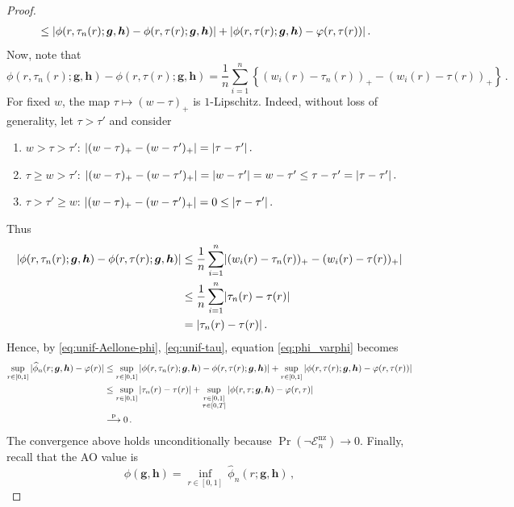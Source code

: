 \documentclass{article}
\makeatletter
\theoremstyle{definition}
\newcommand{\abs}[1]{%
	\ensuremath{%
		\if@display
		\left| #1 \right|
		\else
		\lvert #1 \rvert
		\fi
	}%
}
\newcommand*{\bb}{\boldsymbol}
\def\bh{\bb{h}}
\def\bg{\bb{g}}
\makeatother
\begin{document}
\begin{bibunit}
\begin{proof}
\begin{equation}
\begin{aligned}
			&\leq \abs{\phi(r, \tau_n(r); \bg, \bh) - \phi(r, \tau(r); \bg, \bh) } + \abs{\phi(r, \tau(r); \bg, \bh) - \varphi(r, \tau(r))} \,.
		\end{aligned}
	\end{equation}
Now, note that
$$
	\phi(r, \tau_n(r); \bg, \bh) - \phi(r, \tau(r); \bg, \bh) = \frac{1}{n} \sum_{i = 1}^n \left\{(w_i(r)- \tau_n(r))_{+} - (w_i(r) - \tau(r))_{+}\right\} \,.
$$
For fixed $w$, the map $\tau \mapsto (w - \tau)_{+}$ is $1$-Lipschitz.
Indeed, without loss of generality, let $\tau > \tau'$ and consider
\begin{enumerate}
	\item $w > \tau > \tau'$: $\abs{(w - \tau)_{+} - (w - \tau')_{+}} = \abs{\tau - \tau'} \,.$
	\item $\tau \geq w > \tau'$: $\abs{(w - \tau)_{+} - (w - \tau')_{+}} = \abs{w - \tau'} = w - \tau' \leq \tau - \tau' = \abs{\tau - \tau'} \,.$
	\item $\tau > \tau' \geq w$: $\abs{(w - \tau)_{+} - (w - \tau')_{+}} = 0 \leq \abs{\tau - \tau'} \,.$
\end{enumerate}
Thus
$$
	\begin{aligned}
		\abs{\phi(r, \tau_n(r); \bg, \bh) - \phi(r, \tau(r); \bg, \bh)} & \leq \frac{1}{n} \sum_{i = 1}^n \abs{(w_i(r)- \tau_n(r))_{+} - (w_i(r) - \tau(r))_{+}}  \\
		&\leq \frac{1}{n} \sum_{i = 1}^n \abs{\tau_n(r) - \tau(r)} \\
		&=  \abs{\tau_n(r) - \tau(r)} \,.
	\end{aligned}
$$
Hence, by \eqref{eq:unif-Aellone-phi}, \eqref{eq:unif-tau}, equation \eqref{eq:phi_varphi} becomes
	$$
		\begin{aligned}
			 \underset{r \in [0,1]}{\sup}\, \abs{\widehat\phi_n(r;\bg,\bh) - \varphi(r)} &\leq  \underset{r \in [0,1]}{\sup}\,\abs{\phi(r, \tau_n(r); \bg, \bh) - \phi(r, \tau(r); \bg, \bh) } +  \underset{r \in [0,1]}{\sup}\,\abs{\phi(r, \tau(r); \bg, \bh) - \varphi(r, \tau(r))} \\
			&\leq \underset{r \in [0,1]}{\sup}\,  \abs{\tau_n(r) - \tau(r)} +  \underset{\substack{r \in [0,1] \\ \tau \in [0, T]}}{\sup} \,\abs{\phi(r, \tau; \bg, \bh) - \varphi(r, \tau)} \\
			&\overset{\mathrm p}{\longrightarrow} 0 \,.
		\end{aligned}
	$$
	The convergence above holds unconditionally because
	$\Pr(\lnot\mathcal E_n^{\mathrm{nz}})\to0$.
	Finally, recall that the AO value is
	$$
	    \phi(\bg,\bh) = \underset{r \in [0,1]}{\inf} \, \widehat\phi_n(r;\bg,\bh) \,,
$$
\end{proof}
\end{bibunit}
\end{document}
